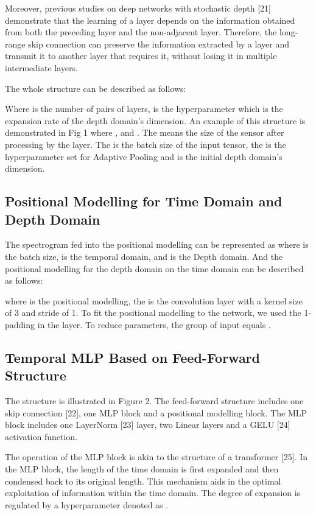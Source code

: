 \documentclass[runningheads]{llncs}
\begin{document}
Moreover, previous studies on deep networks with stochastic depth [21] demonstrate that the learning of a layer depends on the information obtained from both the preceding layer and the non-adjacent layer. Therefore, the long-range skip connection can preserve the information extracted by a layer and transmit it to another layer that requires it, without losing it in multiple intermediate layers.

The whole structure can be described as follows:



Where  is the number of pairs of layers,   is the hyperparameter which is the expansion rate  of the depth domain's dimension. An example of this structure is demonstrated in Fig 1 where ,  and . The  means the size of the sensor after processing by the layer. The  is the batch size of the input tensor, the  is the hyperparameter set for Adaptive Pooling and  is the initial depth domain's dimension. 

\subsection{Positional Modelling for Time Domain and Depth Domain}
The spectrogram fed into the positional modelling can be represented as  where  is the batch size,  is the temporal domain, and  is the Depth domain. And the positional modelling for the depth domain on the time domain can be described as follows:

where  is the positional modelling, the  is the convolution layer with a kernel size of 3 and stride of 1. To fit the positional modelling to the network, we used the 1-padding in the layer. To reduce parameters, the group of input equals .

\subsection{ Temporal MLP Based on Feed-Forward Structure}
The structure is illustrated in Figure 2. The feed-forward structure includes one skip connection [22], one MLP block and a positional modelling block. The MLP block includes one LayerNorm [23] layer, two Linear layers and a GELU [24] activation function. 

The operation of the MLP block is akin to the structure of a transformer [25]. In the MLP block, the length of the time domain is first expanded and then condensed back to its original length. This mechanism aids in the optimal exploitation of information within the time domain. The degree of expansion is regulated by a hyperparameter denoted as .
\end{document}
